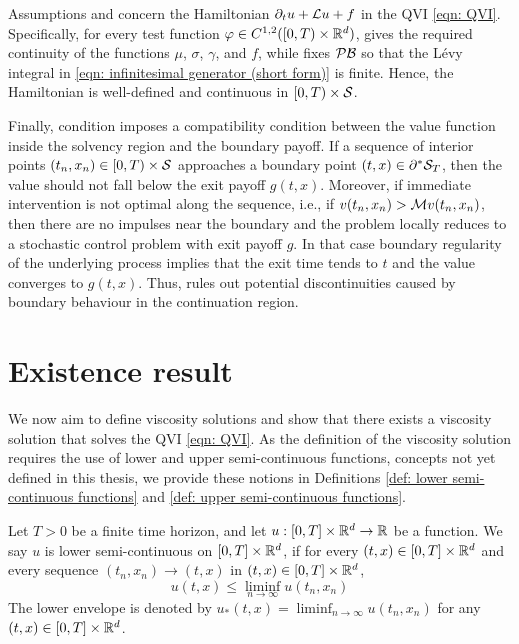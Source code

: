 Assumptions  and  concern the Hamiltonian $\partial_t u + \mathcal{L} u + f$ in the QVI \eqref{eqn: QVI}. Specifically, for every test function $\varphi \in C^{1,2}([0,T) \times \mathbb{R}^d)$,  gives the required continuity of the functions $\mu$, $\sigma$, $\gamma$, and $f$, while  fixes $\mathcal{PB}$ so that the Lévy integral in \eqref{eqn: infinitesimal generator (short form)} is finite. Hence, the Hamiltonian is well-defined and continuous in $[0,T) \times \mathcal{S}$. 

Finally, condition  imposes a compatibility condition between the value function inside the solvency region and the boundary payoff. If a sequence of interior points $(t_n,x_n) \in [0,T) \times \mathcal{S}$ approaches a boundary point $(t,x) \in \partial^* \mathcal{S}_T$, then the value should not fall below the exit payoff $g(t,x)$. Moreover, if immediate intervention is not optimal along the sequence, i.e., if $v(t_n,x_n) > \mathcal{M} v(t_n,x_n)$, then there are no impulses near the boundary and the problem locally reduces to a stochastic control problem with exit payoff $g$. In that case boundary regularity of the underlying process implies that the exit time tends to $t$ and the value converges to $g(t,x)$. Thus,  rules out potential discontinuities caused by boundary behaviour in the continuation region. 

\section{Existence result}
\label{section: Existence}
We now aim to define viscosity solutions and show that there exists a viscosity solution that solves the QVI \eqref{eqn: QVI}. As the definition of the viscosity solution requires the use of lower and upper semi-continuous functions, concepts not yet defined in this thesis, we provide these notions in Definitions \ref{def: lower semi-continuous functions} and \ref{def: upper semi-continuous functions}.

\begin{definition}
\label{def: lower semi-continuous functions}
    Let $T>0$ be a finite time horizon, and let $u: [0,T] \times \mathbb{R}^d \rightarrow \mathbb{R}$ be a function. We say $u$ is lower semi-continuous on $[0,T] \times \mathbb{R}^d$, if for every $(t,x) \in [0,T] \times \mathbb{R}^d$ and every sequence $(t_n,x_n) \rightarrow (t,x)$ in $(t,x) \in [0,T] \times \mathbb{R}^d$, 
    \begin{equation*}
        u(t,x) \leq \liminf_{n \rightarrow \infty} u(t_n,x_n)
    \end{equation*}
    The lower envelope is denoted by $u_*(t,x) = \liminf_{n \rightarrow \infty} u(t_n,x_n)$ for any $(t,x) \in [0,T] \times \mathbb{R}^d$.
\end{definition}

